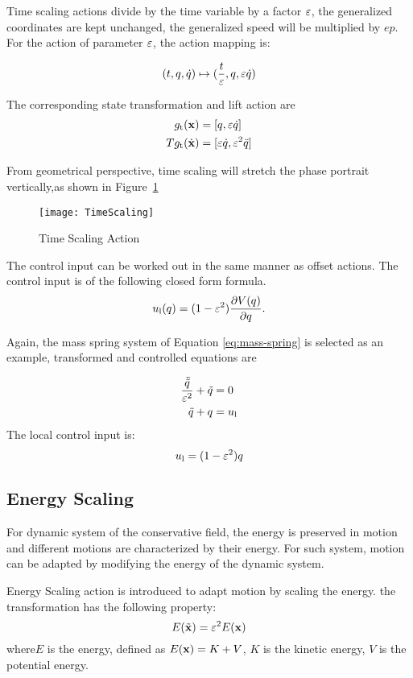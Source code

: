 Time scaling actions divide by the time variable by a factor $\varepsilon$, the generalized coordinates are kept unchanged, the generalized speed will be multiplied by $ep$.
For the action of parameter $\varepsilon$, the action mapping is: 


\[
(t,q,\dot{q}) \mapsto (\frac{t}{\varepsilon},q,\varepsilon \dot{q})
\]

The corresponding state transformation and lift action are
\begin{align}
g_{\mathrm{t}}(\mathbf{x})&=[q,\varepsilon \dot{q}] \nonumber \\
Tg_{\mathrm{t}}(\dot{\mathbf{x}})&=[\varepsilon \dot{q},\varepsilon^2 \ddot{q}]\nonumber
\end{align}

From geometrical perspective, time scaling will stretch the phase portrait vertically,as shown in Figure~\ref{fig:gts}
\begin{figure}[!htbp]
  \begin{center}
    \texttt{[image: TimeScaling]}
	 \caption{Time Scaling Action}
    \label{fig:gts}
\end{center}
\end{figure}

The control input can be worked out in the same manner as offset actions.
The control input is of the following closed form formula.
\begin{equation}
u_{\mathrm{l}}(q) = (1-\varepsilon^2) \frac{\partial V(q)}{\partial q}.
\end{equation}

Again, the mass spring system of Equation \ref{eq:mass-spring} is selected as an example, transformed and controlled equations are

\begin{align}
\frac{\ddot{\tilde{q}}}{\varepsilon^2}+\tilde{q}&=0 \nonumber \\
\ddot{q}+q&=u_{\mathrm{l}} \nonumber
\end{align}
The local control input is:
\[
u_{\mathrm{l}}=(1-\varepsilon^2)q
\]




\subsection*{Energy Scaling}
For dynamic system of the conservative field,
the energy is preserved in motion and different motions are characterized by their energy.
For such system, motion can be adapted by modifying the energy of the dynamic system.

Energy Scaling action is introduced to adapt motion by scaling the energy.
the transformation has the following property:
\[
E(\tilde{\mathbf{x}})=\varepsilon^2 E(\mathbf{x})
\]
 where$E$ is the energy, defined as $E(\mathbf{x})=K+V$,  $K$ is the kinetic energy,
$V$ is the potential energy.

